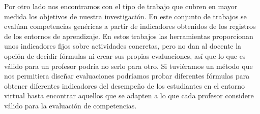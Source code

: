 Por otro lado nos encontramos con el tipo de trabajo que cubren en mayor medida los objetivos de nuestra investigación. En este conjunto de trabajos se evalúan competencias genéricas a partir de indicadores obtenidos de los registros de los entornos de aprendizaje. En estos trabajos las herramientas proporcionan unos indicadores fijos sobre actividades concretas, pero no dan al docente la opción de decidir fórmulas ni crear sus propias evaluaciones, así que lo que es válido para un profesor podría no serlo para otro. Si tuviéramos un método que nos permitiera diseñar evaluaciones podríamos probar diferentes fórmulas para obtener diferentes indicadores del desempeño de los estudiantes en el entorno virtual hasta encontrar aquellos que se adapten a lo que cada profesor considere válido para la evaluación de competencias.

\pagestyle{fancy}



